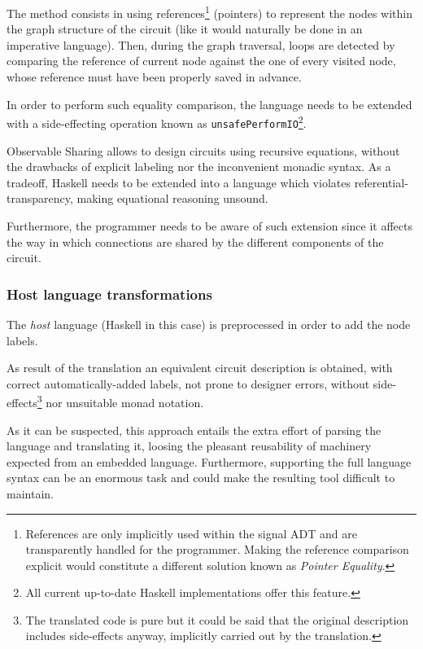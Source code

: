 \documentclass[a4paper,twoside,11pt]{article}
\begin{document}
\begin{body}
  The method consists in using references\footnote{References are only
    implicitly used within the signal ADT and are transparently
    handled for the programmer. Making the reference comparison
    explicit would constitute a different solution known as
    \textit{Pointer Equality}.} (pointers) to represent the nodes
  within the graph structure of the circuit (like it would naturally
  be done in an imperative language).  Then, during the graph
  traversal, loops are detected by comparing the reference of
  current node against the one of every visited node, whose reference
  must have been properly saved in advance.
  
  In order to perform such equality comparison, the language needs to
  be extended with a side-effecting operation known as
  \texttt{unsafePerformIO}\footnote{All current up-to-date Haskell
    implementations offer this feature.}.
  
  Observable Sharing allows to design circuits using recursive
  equations, without the drawbacks of explicit labeling nor the
  inconvenient monadic syntax.  As a tradeoff, Haskell needs to be
  extended into a language which violates referential-transparency,
  making equational reasoning unsound.
  
  Furthermore, the programmer needs to be aware of such extension
  since it affects the way in which connections are shared by the
  different components of the circuit.
  
  \subsubsection{Host language transformations}
  The \textit{host} language (Haskell in this case) is preprocessed in
  order to add the node labels.
  
  As result of the translation an equivalent circuit description is obtained,
  with correct automatically-added labels, not prone to designer errors,
  without side-effects\footnote{The translated code is pure but it could be
    said that the original description includes side-effects anyway, implicitly
    carried out by the translation.} nor unsuitable monad notation.
  
  As it can be suspected, this approach entails the extra effort
  of parsing the language and translating it, loosing the pleasant
  reusability of machinery expected from an embedded language.
  Furthermore, supporting the full language syntax can be an enormous task
  and could make the resulting tool difficult to maintain. 
  


\end{body}
\end{document}
